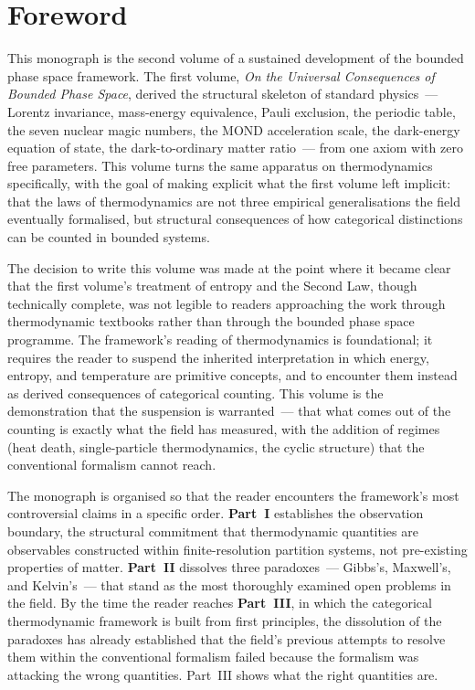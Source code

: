
\chapter*{Foreword}

\noindent
This monograph is the second volume of a sustained development of the bounded
phase space framework. The first volume, \textit{On the Universal Consequences
of Bounded Phase Space}, derived the structural skeleton of standard physics~---
Lorentz invariance, mass-energy equivalence, Pauli exclusion, the periodic table,
the seven nuclear magic numbers, the MOND acceleration scale, the dark-energy
equation of state, the dark-to-ordinary matter ratio~--- from one axiom with zero
free parameters. This volume turns the same apparatus on thermodynamics specifically,
with the goal of making explicit what the first volume left implicit: that the laws
of thermodynamics are not three empirical generalisations the field eventually
formalised, but structural consequences of how categorical distinctions can be
counted in bounded systems.

The decision to write this volume was made at the point where it became clear that
the first volume's treatment of entropy and the Second Law, though technically
complete, was not legible to readers approaching the work through thermodynamic
textbooks rather than through the bounded phase space programme. The framework's
reading of thermodynamics is foundational; it requires the reader to suspend the
inherited interpretation in which energy, entropy, and temperature are primitive
concepts, and to encounter them instead as derived consequences of categorical
counting. This volume is the demonstration that the suspension is warranted~---
that what comes out of the counting is exactly what the field has measured, with the
addition of regimes (heat death, single-particle thermodynamics, the cyclic structure)
that the conventional formalism cannot reach.

\medskip

The monograph is organised so that the reader encounters the framework's most
controversial claims in a specific order. \textbf{Part~I} establishes the observation
boundary, the structural commitment that thermodynamic quantities are observables
constructed within finite-resolution partition systems, not pre-existing properties
of matter. \textbf{Part~II} dissolves three paradoxes~--- Gibbs's, Maxwell's, and
Kelvin's~--- that stand as the most thoroughly examined open problems in the field.
By the time the reader reaches \textbf{Part~III}, in which the categorical
thermodynamic framework is built from first principles, the dissolution of the
paradoxes has already established that the field's previous attempts to resolve them
within the conventional formalism failed because the formalism was attacking the wrong
quantities. Part~III shows what the right quantities are.

